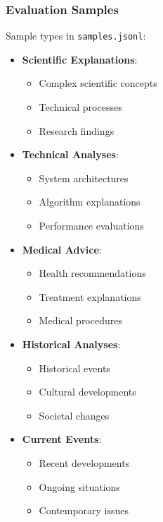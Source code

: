 \subsubsection{Evaluation Samples}
Sample types in \texttt{samples.jsonl}:
\begin{itemize}
    \item \textbf{Scientific Explanations}:
    \begin{itemize}
        \item Complex scientific concepts
        \item Technical processes
        \item Research findings
    \end{itemize}
    \item \textbf{Technical Analyses}:
    \begin{itemize}
        \item System architectures
        \item Algorithm explanations
        \item Performance evaluations
    \end{itemize}
    \item \textbf{Medical Advice}:
    \begin{itemize}
        \item Health recommendations
        \item Treatment explanations
        \item Medical procedures
    \end{itemize}
    \item \textbf{Historical Analyses}:
    \begin{itemize}
        \item Historical events
        \item Cultural developments
        \item Societal changes
    \end{itemize}
    \item \textbf{Current Events}:
    \begin{itemize}
        \item Recent developments
        \item Ongoing situations
        \item Contemporary issues
    \end{itemize}
\end{itemize}

